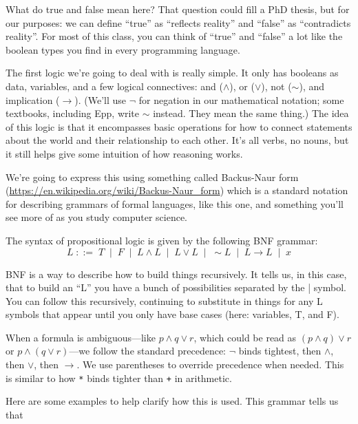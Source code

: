 \documentclass[11pt]{article}
\begin{document}
What do true and false mean here? That question could fill a PhD thesis, but for our purposes: we can define ``true'' as ``reflects reality'' and ``false'' as ``contradicts reality''. For most of this class, you can think of ``true'' and ``false'' a lot like the boolean types you find in every programming language.

The first logic we're going to deal with is really simple. It only has booleans as data, variables, and a few logical connectives: and ($\wedge$), or ($\vee$), not ($\sim$), and implication ($\to$). (We'll use $\lnot$ for negation in our mathematical notation; some textbooks, including Epp, write $\sim$ instead. They mean the same thing.) The idea of this logic is that it encompasses basic operations for how to connect statements about the world and their relationship to each other. It's all verbs, no nouns, but it still helps give some intuition of how reasoning works.

We're going to express this using something called Backus-Naur form (\url{https://en.wikipedia.org/wiki/Backus-Naur_form}) which is a standard notation for describing grammars of formal languages, like this one, and something you'll see more of as you study computer science.

\begin{definition}
The syntax of propositional logic is given by the following BNF grammar:
\[
L \;::=\; T \;\mid\; F \;\mid\; L \wedge L \;\mid\; L \vee L \;\mid\; {\sim}L \;\mid\; L \to L \;\mid\; x
\]
\end{definition}

BNF is a way to describe how to build things recursively. It tells us, in this case, that to build an ``L'' you have a bunch of possibilities separated by the | symbol. You can follow this recursively, continuing to substitute in things for any L symbols that appear until you only have base cases (here: variables, T, and F).

When a formula is ambiguous---like $p \wedge q \vee r$, which could be read as $(p \wedge q) \vee r$ or $p \wedge (q \vee r)$---we follow the standard precedence: $\lnot$ binds tightest, then $\wedge$, then $\vee$, then $\to$. We use parentheses to override precedence when needed. This is similar to how \texttt{*} binds tighter than \texttt{+} in arithmetic.

Here are some examples to help clarify how this is used. This grammar tells us that
\end{document}
